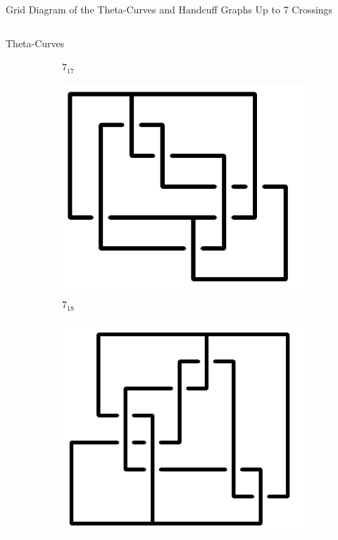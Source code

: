 \documentclass[final]{beamer}
\begin{document}
\begin{frame}[t]
\begin{alertblock}{Grid Diagram of the Theta-Curves and Handcuff Graphs Up to 7 Crossings}
\begin{columns}[t]
\begin{column}{0.5\textwidth}
\begin{alertblock}{Theta-Curves}
\begin{figure}
\begin{subfigure}{0.075\textwidth}
    \caption{$7_{17}$} 
    \end{subfigure}
    \begin{subfigure}{0.075\textwidth}
    \includegraphics[width=\columnwidth]{../Midterm_Poster/grid_diagram/theta_7_18.png}
    \caption{$7_{18}$} 
    \end{subfigure}
    \begin{subfigure}{0.075\textwidth}
    \includegraphics[width=\columnwidth]{../Midterm_Poster/grid_diagram/theta_7_19.png}

\end{subfigure}
\end{figure}
\end{alertblock}
\end{column}
\end{columns}
\end{alertblock}
\end{frame}
\end{document}

